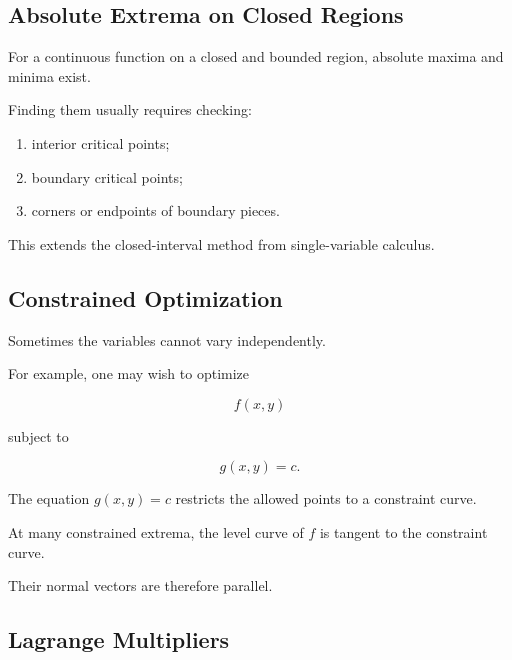 \subsection{Absolute Extrema on Closed Regions}
\label{subsec:absolute-extrema-closed-regions}

For a continuous function on a closed and bounded region, absolute maxima
and minima exist.

Finding them usually requires checking:

\begin{enumerate}
    \item interior critical points;
    \item boundary critical points;
    \item corners or endpoints of boundary pieces.
\end{enumerate}

This extends the closed-interval method from single-variable calculus.

\subsection{Constrained Optimization}
\label{subsec:constrained-optimization}

Sometimes the variables cannot vary independently.

For example, one may wish to optimize

\[ f(x,y) \]

subject to

\[ g(x,y)=c. \]

The equation \(g(x,y)=c\) restricts the allowed points to a constraint curve.

At many constrained extrema, the level curve of \(f\) is tangent to the
constraint curve.

Their normal vectors are therefore parallel.

\subsection{Lagrange Multipliers}
\label{subsec:lagrange-multipliers}

